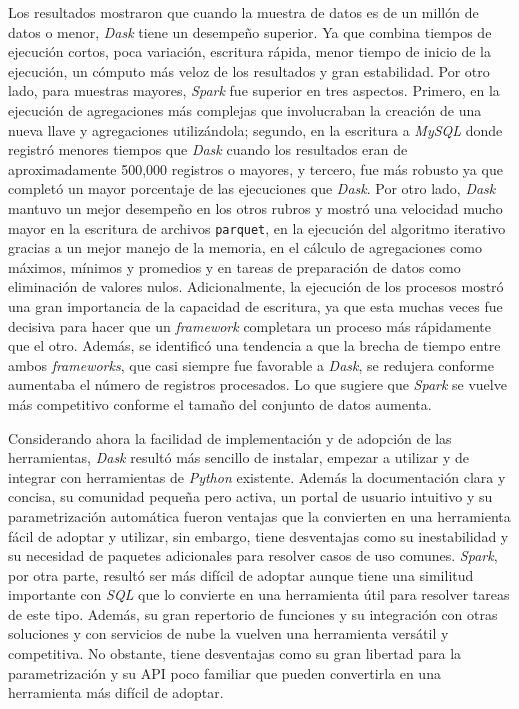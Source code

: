 \documentclass[11pt, oneside]{book}
\begin{document}
Los resultados mostraron que cuando la muestra de datos es de un millón de datos o menor, \textit{Dask} tiene un desempeño superior. Ya que combina tiempos de ejecución cortos, poca variación, 
escritura rápida, menor tiempo de inicio de la ejecución, un cómputo más veloz de los resultados y gran estabilidad. Por otro lado, para muestras mayores, \textit{Spark} fue superior en tres aspectos. Primero, en la ejecución de agregaciones más complejas que involucraban la creación de una nueva llave y agregaciones utilizándola; segundo, en la escritura a \textit{MySQL} donde registró menores tiempos que \textit{Dask} cuando los resultados eran de aproximadamente 500,000 registros o mayores, y tercero, fue más robusto ya que completó un mayor porcentaje de las ejecuciones que \textit{Dask}. Por otro lado, \textit{Dask} mantuvo un mejor desempeño en los otros rubros y mostró una velocidad mucho mayor en la escritura de archivos \texttt{parquet}, en la ejecución del algoritmo iterativo gracias a un mejor manejo de la memoria, en el cálculo de agregaciones como máximos, mínimos y promedios y en tareas de preparación de datos como eliminación de valores nulos. Adicionalmente, la ejecución de los procesos mostró una gran importancia de la capacidad de escritura, ya que esta muchas veces fue decisiva para hacer que un \textit{framework} completara un proceso más rápidamente que el otro. Además, se identificó una tendencia a que la brecha de tiempo entre ambos \textit{frameworks}, que casi siempre fue favorable a \textit{Dask}, se redujera conforme aumentaba el número de registros procesados. Lo que sugiere que \textit{Spark} se vuelve más competitivo conforme el tamaño del conjunto de datos aumenta.

Considerando ahora la facilidad de implementación y de adopción de las herramientas, \textit{Dask} resultó más sencillo de instalar, empezar a utilizar y de integrar con herramientas de \textit{Python} existente. Además la documentación clara y concisa, su comunidad pequeña pero activa, un portal de usuario intuitivo y su parametrización automática fueron ventajas que la convierten en una herramienta fácil de adoptar y utilizar, sin embargo, tiene desventajas como su inestabilidad y su necesidad de paquetes adicionales para resolver casos de uso comunes. \textit{Spark}, por otra parte, resultó ser más difícil de adoptar aunque tiene una similitud importante con \textit{SQL} que lo convierte en una herramienta útil para resolver tareas de este tipo. Además, su gran repertorio de funciones y su integración con otras soluciones y con servicios de nube la vuelven una herramienta versátil y competitiva. No obstante, tiene desventajas como su gran libertad para la parametrización y su API poco familiar que pueden convertirla en una herramienta más difícil de adoptar.
\end{document}
